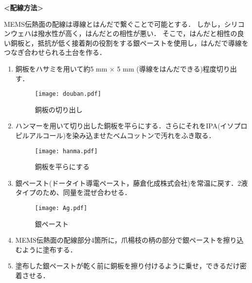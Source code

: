 \textbf{<配線方法>}

MEMS伝熱面の配線は導線とはんだで繋ぐことで可能とする．
しかし，シリコンウェハは撥水性が高く，はんだとの相性が悪い．
そこで，はんだと相性の良い銅板と，抵抗が低く接着剤の役割をする銀ペーストを使用し，はんだで導線をつなぎ合わせられる土台を作る．

\begin{enumerate}

\item 銅板をハサミを用いて約5 mm × 5 mm (導線をはんだできる)程度切り出す．
 
\begin{figure}[ht]
\vspace{0zh}
\begin{center}
\texttt{[image: douban.pdf]}
\vspace{0zh}
\caption{銅板の切り出し}\label{ wafer}
\end{center}
\vspace{0zh}
\end{figure} 
\item ハンマーを用いて切り出した銅板を平らにする．さらにそれをIPA(イソプロピルアルコール)を染み込ませたベムコットンで汚れをふき取る．
 
\begin{figure}[ht]
\vspace{0zh}
\begin{center}
\texttt{[image: hanma.pdf]}
\vspace{0zh}
\caption{銅板を平らにする}\label{ wafer}
\end{center}
\vspace{0zh}
\end{figure}



 
\item 銀ペースト(ドータイト導電ペースト，藤倉化成株式会社)を常温に戻す．2液タイプのため、同量を混ぜ合わせる．
 

\begin{figure}[ht]
\vspace{0zh}
\begin{center}
\texttt{[image: Ag.pdf]}
\vspace{-1zh}
\caption{銀ペースト}\label{ wafer}
\end{center}
\vspace{0zh}
\end{figure}

\item MEMS伝熱面の配線部分4箇所に，爪楊枝の柄の部分で銀ペーストを擦り込むように塗布する．
\item 塗布した銀ペーストが乾く前に銅板を擦り付けるように乗せ，できるだけ密着させる．


\end{enumerate}
